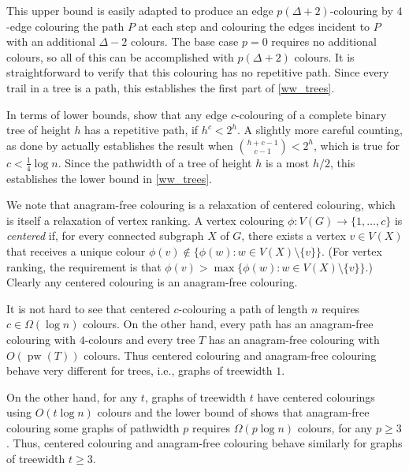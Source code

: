\documentclass[kpfonts]{patmorin}
\DeclareMathOperator{\pw}{pw}
\begin{document}
This upper bound is easily adapted to produce an edge $p(\Delta+2)$-colouring by $4$-edge colouring the path $P$ at each step and colouring the edges incident to $P$ with an additional $\Delta-2$ colours. The base case $p=0$ requires no additional colours, so all of this can be accomplished with $p(\Delta+2)$ colours.  It is straightforward to verify that this colouring has no repetitive path.  Since every trail in a tree is a path, this establishes the first part of \cref{ww_trees}.


In terms of lower bounds, \citet[Theorem~13]{wilson.wood:anagram-free} show that any edge $c$-colouring of a complete binary tree of height $h$ has a repetitive path, if $h^c < 2^h$.  A slightly more careful counting, as done by \citet[Proposition~2.1]{kamcev.luczak.ea:anagram-free} actually establishes the result when $\binom{h+c-1}{c-1} < 2^h$, which is true for $c < \tfrac{1}{4}\log n$.  Since the pathwidth of a tree of height $h$ is a most $h/2$, this establishes the lower bound in \cref{ww_trees}.


We note that anagram-free colouring is a relaxation of centered colouring, which is itself a relaxation of vertex ranking.  A vertex colouring $\phi:V(G)\to\{1,\ldots,c\}$ is \emph{centered} if, for every connected subgraph $X$ of $G$, there exists a vertex $v\in V(X)$ that receives a unique colour $\phi(v)\not\in\{\phi(w):w\in V(X)\setminus\{v\}\}$. (For vertex ranking, the requirement is that $\phi(v)>\max\{\phi(w):w\in V(X)\setminus\{v\}\}$.)  Clearly any centered colouring is an anagram-free colouring.

It is not hard to see that centered $c$-colouring a path of length $n$ requires $c\in \Omega(\log n)$ colours. On the other hand, every path has an anagram-free colouring with $4$-colours and every tree $T$ has an anagram-free colouring with $O(\pw(T))$ colours. Thus centered colouring and anagram-free colouring behave very different for trees, i.e., graphs of treewidth $1$.

On the other hand, for any $t$, graphs of treewidth $t$ have centered colourings using $O(t\log n)$ colours and the lower bound of \citet{carmi.dujmovic.ea:anagram-free} shows that anagram-free colouring some graphs of pathwidth $p$ requires $\Omega(p\log n)$ colours, for any $p\ge 3$.  Thus, centered colouring and anagram-free colouring behave similarly for graphs of treewidth $t\ge 3$.
\end{document}
